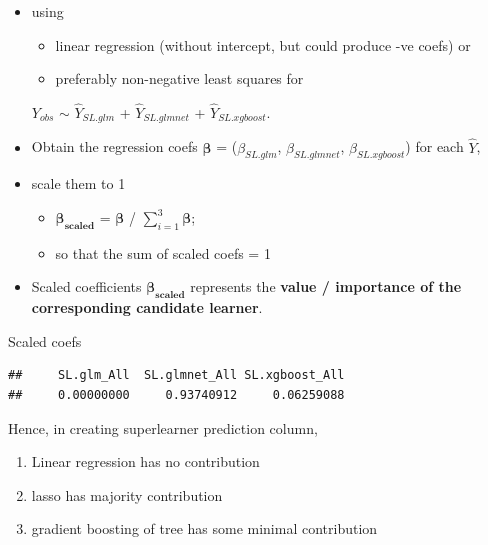 \documentclass[
]{book}
\newenvironment{Shaded}{\begin{snugshade}}{\end{snugshade}}
\newcommand{\NormalTok}[1]{#1}
\newcommand{\SpecialCharTok}[1]{\textcolor[rgb]{0.00,0.00,0.00}{#1}}
\providecommand{\tightlist}{%
  \setlength{\itemsep}{0pt}\setlength{\parskip}{0pt}}
\begin{document}
\begin{itemize}
\item
  using

  \begin{itemize}
  \tightlist
  \item
    linear regression (without intercept, but could produce -ve coefs) or
  \item
    preferably non-negative least squares for
  \end{itemize}

  \(Y_{obs}\) \(\sim\) \(\hat{Y}_{SL.glm}\) + \(\hat{Y}_{SL.glmnet}\) + \(\hat{Y}_{SL.xgboost}\).
\item
  Obtain the regression coefs \(\mathbf{\beta}\) = (\(\beta_{SL.glm}\), \(\beta_{SL.glmnet}\), \(\beta_{SL.xgboost}\)) for each \(\hat{Y}\),
\item
  scale them to 1

  \begin{itemize}
  \tightlist
  \item
    \(\mathbf{\beta_{scaled}}\) = \(\mathbf{\beta}\) / \(\sum_{i=1}^3{\mathbf{\beta}}\);
  \item
    so that the sum of scaled coefs = 1
  \end{itemize}
\item
  Scaled coefficients \(\mathbf{\beta_{scaled}}\) represents the \textbf{value / importance of the corresponding candidate learner}.
\end{itemize}

Scaled coefs

\begin{Shaded}
\end{Shaded}

\begin{verbatim}
##     SL.glm_All  SL.glmnet_All SL.xgboost_All 
##     0.00000000     0.93740912     0.06259088
\end{verbatim}

Hence, in creating superlearner prediction column,

\begin{enumerate}
\def\labelenumi{\alph{enumi}.}
\tightlist
\item
  Linear regression has no contribution
\item
  lasso has majority contribution
\item
  gradient boosting of tree has some minimal contribution
\end{enumerate}
\end{document}
